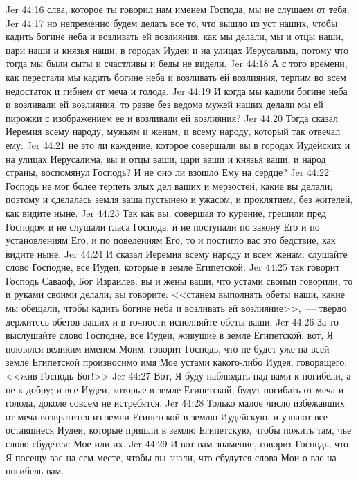 \vs Jer 44:16 слва, которое ты говорил нам именем Господа, мы не слушаем от тебя;
\vs Jer 44:17 но непременно будем делать все то, что вышло из уст наших, чтобы кадить богине неба и возливать ей возлияния, как мы делали, мы и отцы наши, цари наши и князья наши, в городах Иудеи и на улицах Иерусалима, потому что тогда мы были сыты и счастливы и беды не видели.
\vs Jer 44:18 А с того времени, как перестали мы кадить богине неба и возливать ей возлияния, терпим во всем недостаток и гибнем от меча и голода.
\vs Jer 44:19 И когда мы кадили богине неба и возливали ей возлияния, то разве без ведома мужей наших делали мы ей пирожки с изображением ее и возливали ей возлияния?
\vs Jer 44:20 Тогда сказал Иеремия всему народу, мужьям и женам, и всему народу, который так отвечал ему:
\vs Jer 44:21 не это ли каждение, которое совершали вы в городах Иудейских и на улицах Иерусалима, вы и отцы ваши, цари ваши и князья ваши, и народ страны, воспомянул Господь? И не оно ли взошло Ему на сердце?
\vs Jer 44:22 Господь не мог более терпеть злых дел ваших и мерзостей, какие вы делали; поэтому и сделалась земля ваша пустынею и ужасом, и проклятием, без жителей, как видите ныне.
\vs Jer 44:23 Так как вы, совершая то курение, грешили пред Господом и не слушали гласа Господа, и не поступали по закону Его и по установлениям Его, и по повелениям Его, то и постигло вас это бедствие, как видите ныне.
\vs Jer 44:24 И сказал Иеремия всему народу и всем женам: слушайте слово Господне, все Иудеи, которые в земле Египетской:
\vs Jer 44:25 так говорит Господь Саваоф, Бог Израилев: вы и жены ваши, что устами своими говорили, то и руками своими делали; вы говорите: <<станем выполнять обеты наши, какие мы обещали, чтобы кадить богине неба и возливать ей возлияние>>,~--- твердо держитесь обетов ваших и в точности исполняйте обеты ваши.
\vs Jer 44:26 За то выслушайте слово Господне, все Иудеи, живущие в земле Египетской: вот, Я поклялся великим именем Моим, говорит Господь, что не будет уже на всей земле Египетской произносимо имя Мое устами какого-либо Иудея, говорящего: <<жив Господь Бог!>>
\vs Jer 44:27 Вот, Я буду наблюдать над вами к погибели, а не к добру; и все Иудеи, которые в земле Египетской, будут погибать от меча и голода, доколе совсем не истребятся.
\vs Jer 44:28 Только малое число избежавших от меча возвратится из земли Египетской в землю Иудейскую, и узнают все оставшиеся Иудеи, которые пришли в землю Египетскую, чтобы пожить там, чье слово сбудется: Мое или их.
\vs Jer 44:29 И вот вам знамение, говорит Господь, что Я посещу вас на сем месте, чтобы вы знали, что сбудутся слова Мои о вас на погибель вам.
